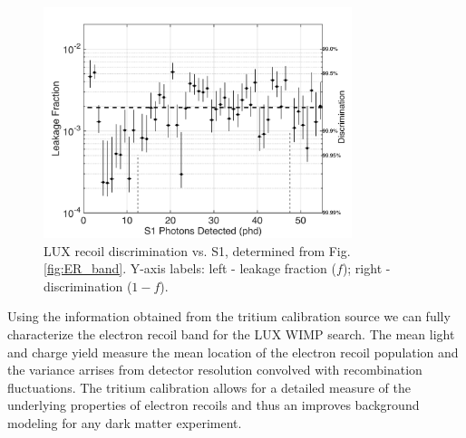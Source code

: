 \begin{figure}[h!]\centering
\includegraphics[width=90mm]{fig/CH3T_Leakage_Run03.png}
\caption{LUX recoil discrimination vs. S1, determined from Fig. \ref{fig:ER_band}. Y-axis labels: left -  leakage fraction ($f$); right - discrimination ($1-f$).}
\label{fig:Leak}
\end{figure}

Using the information obtained from the tritium calibration source we can fully characterize the electron recoil band for the LUX WIMP search. The mean light and charge yield measure the mean location of the electron recoil population and the variance arrises from detector resolution convolved with recombination fluctuations. The tritium calibration allows for a detailed measure of the underlying properties of electron recoils and thus an improves background modeling for any dark matter experiment.

